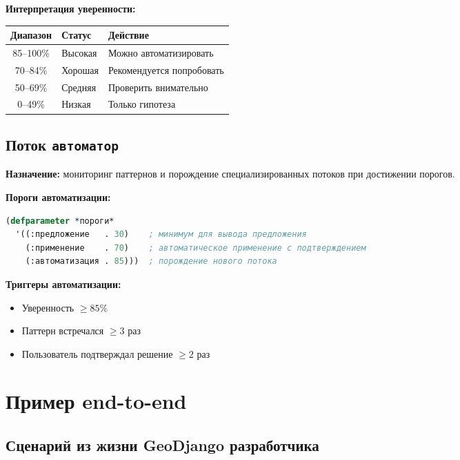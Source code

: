 \documentclass[12pt, a4paper, twoside]{article}
\begin{document}
\textbf{Интерпретация уверенности:}

\begin{center}
\begin{tabular}{cll}
  \toprule
  \textbf{Диапазон} & \textbf{Статус} & \textbf{Действие} \\
  \midrule
  85--100\% & Высокая & Можно автоматизировать \\
  70--84\%  & Хорошая & Рекомендуется попробовать \\
  50--69\%  & Средняя & Проверить внимательно \\
  0--49\%   & Низкая  & Только гипотеза \\
  \bottomrule
\end{tabular}
\end{center}

\subsection{Поток \texttt{автоматор}}

\textbf{Назначение:} мониторинг паттернов и порождение специализированных потоков при достижении порогов.

\textbf{Пороги автоматизации:}

\begin{lstlisting}[language=CommonLisp,caption={Параметры порогов в Common Lisp}]
(defparameter *пороги*
  '((:предложение   . 30)    ; минимум для вывода предложения
    (:применение    . 70)    ; автоматическое применение с подтверждением
    (:автоматизация . 85)))  ; порождение нового потока
\end{lstlisting}

\textbf{Триггеры автоматизации:}
\begin{itemize}[leftmargin=1.5em]
  \item Уверенность $\geq 85\%$
  \item Паттерн встречался $\geq 3$ раз
  \item Пользователь подтверждал решение $\geq 2$ раз
\end{itemize}

\section{Пример end-to-end}

\subsection{Сценарий из жизни GeoDjango разработчика}
\end{document}
